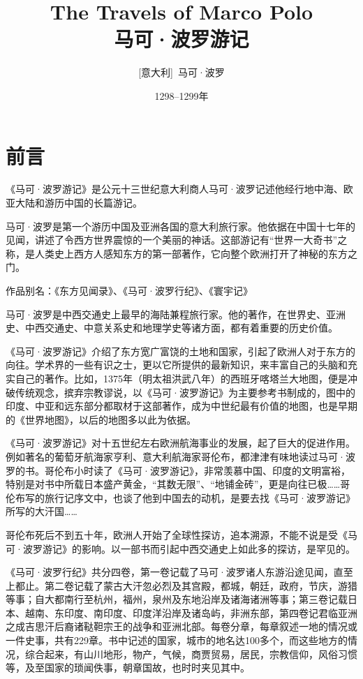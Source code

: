 \documentclass[12pt,UTF8]{ctexbook}
\title{\heiti\zihao{0} The Travels of Marco Polo \\马可·波罗游记}
\author{[意大利]\ 马可·波罗}
\date{1298--1299年}
\begin{document}
\maketitle
\tableofcontents

\frontmatter
\chapter{前言}

《马可·波罗游记》是公元十三世纪意大利商人马可·波罗记述他经行地中海、欧亚大陆和游历中国的长篇游记。

马可·波罗是第一个游历中国及亚洲各国的意大利旅行家。他依据在中国十七年的见闻，讲述了令西方世界震惊的一个美丽的神话。这部游记有“世界一大奇书”之称，是人类史上西方人感知东方的第一部著作，它向整个欧洲打开了神秘的东方之门。

作品别名：《东方见闻录》、《马可·波罗行纪》、《寰宇记》

马可·波罗是中西交通史上最早的海陆兼程旅行家。他的著作，在世界史、亚洲史、中西交通史、中意关系史和地理学史等诸方面，都有着重要的历史价值。

《马可·波罗游记》介绍了东方宽广富饶的土地和国家，引起了欧洲人对于东方的向往。学术界的一些有识之士，更以它所提供的最新知识，来丰富自己的头脑和充实自己的著作。比如，1375年（明太祖洪武八年）的西班牙喀塔兰大地图，便是冲破传统观念，摈弃宗教谬说，以《马可·波罗游记》为主要参考书制成的，图中的印度、中亚和远东部分都取材于这部著作，成为中世纪最有价值的地图，也是早期的《世界地图》，以后的地图多以此为依据。

《马可·波罗游记》对十五世纪左右欧洲航海事业的发展，起了巨大的促进作用。例如著名的葡萄牙航海家亨利、意大利航海家哥伦布，都津津有味地读过马可·波罗的书。哥伦布小时读了《马可·波罗游记》，非常羡慕中国、印度的文明富裕，特别是对书中所载日本盛产黄金，“其数无限”、“地铺金砖”，更是向往已极……哥伦布写的旅行记序文中，也谈了他到中国去的动机，是要去找《马可·波罗游记》所写的大汗国……

哥伦布死后不到五十年，欧洲人开始了全球性探访，追本溯源，不能不说是受《马可·波罗游记》的影响。以一部书而引起中西交通史上如此多的探访，是罕见的。

《马可·波罗行纪》共分四卷，第一卷记载了马可·波罗诸人东游沿途见闻，直至上都止。第二卷记载了蒙古大汗忽必烈及其宫殿，都城，朝廷，政府，节庆，游猎等事；自大都南行至杭州，福州，泉州及东地沿岸及诸海诸洲等事；第三卷记载日本、越南、东印度、南印度、印度洋沿岸及诸岛屿，非洲东部，第四卷记君临亚洲之成吉思汗后裔诸鞑靼宗王的战争和亚洲北部。每卷分章，每章叙述一地的情况或一件史事，共有229章。书中记述的国家，城市的地名达100多个，而这些地方的情况，综合起来，有山川地形，物产，气候，商贾贸易，居民，宗教信仰，风俗习惯等，及至国家的琐闻佚事，朝章国故，也时时夹见其中。
\end{document}
